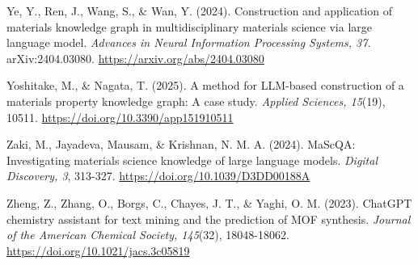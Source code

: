 \documentclass[11pt,a4paper,oneside]{report}
\begin{document}
Ye, Y., Ren, J., Wang, S., \& Wan, Y. (2024). Construction and application of materials knowledge graph in multidisciplinary materials science via large language model. \emph{Advances in Neural Information Processing Systems, 37}. arXiv:2404.03080. \href{https://arxiv.org/abs/2404.03080}{https://arxiv.org/abs/2404.03080}

Yoshitake, M., \& Nagata, T. (2025). A method for LLM-based construction of a materials property knowledge graph: A case study. \emph{Applied Sciences, 15}(19), 10511. \href{https://doi.org/10.3390/app151910511}{https://doi.org/10.3390/app151910511}

Zaki, M., Jayadeva, Mausam, \& Krishnan, N. M. A. (2024). MaScQA: Investigating materials science knowledge of large language models. \emph{Digital Discovery, 3}, 313-327. \href{https://doi.org/10.1039/D3DD00188A}{https://doi.org/10.1039/D3DD00188A}

Zheng, Z., Zhang, O., Borgs, C., Chayes, J. T., \& Yaghi, O. M. (2023). ChatGPT chemistry assistant for text mining and the prediction of MOF synthesis. \emph{Journal of the American Chemical Society, 145}(32), 18048-18062. \href{https://doi.org/10.1021/jacs.3c05819}{https://doi.org/10.1021/jacs.3c05819}
\end{document}
